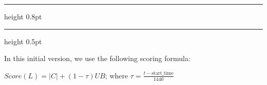 \documentclass{article}
\begin{document}
\pagestyle{empty}
\allowdisplaybreaks[1] 
\setcounter{page}{1}


\setcounter{algorithm}{5}
\begin{center}
    \hrule height 0.8pt
    \vspace{0.3em}
    \label{alg:label_setting_time_budgeted_ub_scoring_early_stopping}
    \vspace{0.2em}
    \hrule height 0.5pt
\end{center}

In this initial version, we use the following scoring formula: 

$Score(L) = |C| + (1 - \tau)UB$; where $\tau = \frac{t - \text{start\_time}}{1440}$
\vspace{0.5em}
\end{document}
